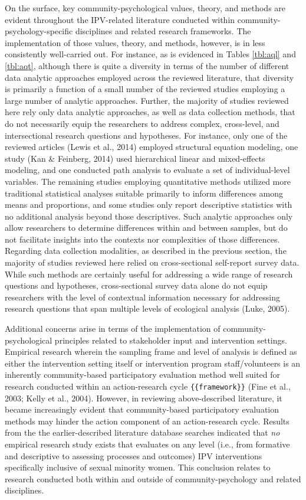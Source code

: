 \documentclass[11pt,]{tufte-book}
\begin{document}
On the surface, key community-psychological values, theory, and methods
are evident throughout the IPV-related literature conducted within
community-psychology-specific disciplines and related research
frameworks. The implementation of those values, theory, and methods,
however, is in less consistently well-carried out. For instance, as is
evidenced in Tables \ref{tbl:aql} and \ref{tbl:aqt}, although there is
quite a diversity in terms of the number of different data analytic
approaches employed across the reviewed literature, that diversity is
primarily a function of a small number of the reviewed studies employing
a large number of analytic approaches. Further, the majority of studies
reviewed here rely only data analytic approaches, as well as data
collection methods, that do not necessarily equip the researchers to
address complex, cross-level, and intersectional research questions and
hypotheses. For instance, only one of the reviewed articles (Lewis et
al., 2014) employed structural equation modeling, one study (Kan \&
Feinberg, 2014) used hierarchical linear and mixed-effects modeling, and
one conducted path analysis to evaluate a set of individual-level
variables. The remaining studies employing quantitative methods utilized
more traditional statistical analyses suitable primarily to inform
differences among means and proportions, and some studies only report
descriptive statistics with no additional analysis beyond those
descriptives. Such analytic approaches only allow researchers to
determine differences within and between samples, but do not facilitate
insights into the contexts nor complexities of those differences.
Regarding data collection modalities, as described in the previous
section, the majority of studies reviewed here relied on cross-sectional
self-report survey data. While such methods are certainly useful for
addressing a wide range of research questions and hypotheses,
cross-sectional survey data alone do not equip researchers with the
level of contextual information necessary for addressing research
questions that span multiple levels of ecological analysis (Luke, 2005).

Additional concerns arise in terms of the implementation of
community-psychological principles related to stakeholder input and
intervention settings. Empirical research wherein the sampling frame and
level of analysis is defined as either the intervention setting itself
or intervention program staff/volunteers is an inherently
community-based participatory evaluation method well suited for research
conducted within an action-research cycle \texttt{\{\{framework\}\}}
(Fine et al., 2003; Kelly et al., 2004). However, in reviewing
above-described literature, it became increasingly evident that
community-based participatory evaluation methods may hinder the action
component of an action-research cycle. Results from the the
earlier-described literature database searches indicated that \emph{no}
empirical research study exists that evaluates on any level (i.e., from
formative and descriptive to assessing processes and outcomes) IPV
interventions specifically inclusive of sexual minority women. This
conclusion relates to research conducted both within and outside of
community-psychology and related disciplines.
\end{document}
